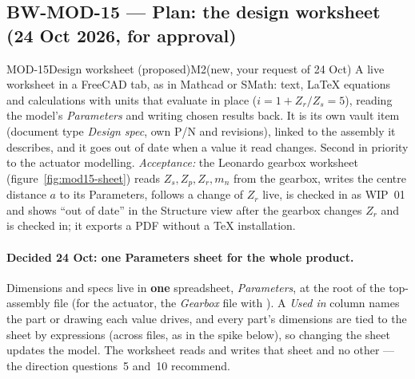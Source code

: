 \subsection{BW-MOD-15 --- Plan: the design worksheet (24 Oct 2026, for approval)}\label{sec:mod15-plan}

\begin{epic}{MOD-15}{Design worksheet (proposed)}{M2}{\stTodo}{(new, your request of 24 Oct)}
A live worksheet in a FreeCAD tab, as in Mathcad or SMath: text, LaTeX equations and calculations with units that
evaluate in place ($i = 1 + Z_r/Z_s = 5$), reading the model's \emph{Parameters} and writing chosen results back. It is
its own vault item (document type \emph{Design spec}, own P/N and revisions), linked to the assembly it describes, and
it goes out of date when a value it read changes. Second in priority to the actuator modelling.
\emph{Acceptance:} the Leonardo gearbox worksheet (figure~\ref{fig:mod15-sheet}) reads $Z_s, Z_p, Z_r, m_n$ from the
gearbox, writes the centre distance $a$ to its Parameters, follows a change of $Z_r$ live, is checked in as
 WIP~01 and shows ``out of date'' in the Structure view after the gearbox changes $Z_r$ and is
checked in; it exports a PDF without a TeX installation.
\end{epic}

\paragraph{Decided 24 Oct: one Parameters sheet for the whole product.} Dimensions and specs live in \textbf{one}
spreadsheet, \emph{Parameters}, at the root of the top-assembly file (for the actuator, the \emph{Gearbox} file with
). A \emph{Used in} column names the part or drawing each value drives, and every part's
dimensions are tied to the sheet by expressions (across files, as  in the spike below),
so changing the sheet updates the model. The worksheet reads and writes that sheet and no other --- the direction
questions~5 and~10 recommend.

